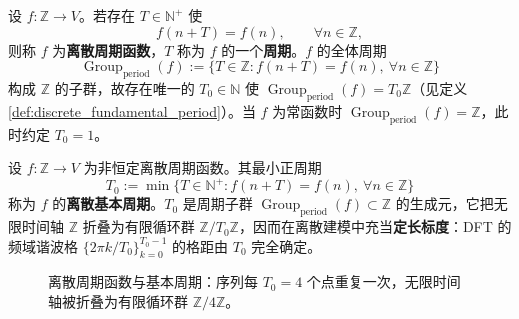 \begin{definition}[离散周期函数]\label{def:discrete_periodic_function}
设 $f:\mathbb{Z}\to V$。若存在 $T\in\mathbb{N}^+$ 使
\[
f(n+T)=f(n),\qquad \forall n\in\mathbb{Z},
\]
则称 $f$ 为\textbf{离散周期函数}，$T$ 称为 $f$ 的一个\textbf{周期}。$f$ 的全体周期
\[
\operatorname{Group}_{\mathrm{period}}(f):=\{T\in\mathbb{Z}:f(n+T)=f(n),\ \forall n\in\mathbb{Z}\}
\]
构成 $\mathbb{Z}$ 的子群，故存在唯一的 $T_0\in\mathbb{N}$ 使 $\operatorname{Group}_{\mathrm{period}}(f)=T_0\mathbb{Z}$（见定义 \ref{def:discrete_fundamental_period}）。当 $f$ 为常函数时 $\operatorname{Group}_{\mathrm{period}}(f)=\mathbb{Z}$，此时约定 $T_0=1$。
\end{definition}

\begin{definition}[离散基本周期与定长标度]\label{def:discrete_fundamental_period}
设 $f:\mathbb{Z}\to V$ 为非恒定离散周期函数。其最小正周期
\[
T_0:=\min\{T\in\mathbb{N}^+:f(n+T)=f(n),\ \forall n\in\mathbb{Z}\}
\]
称为 $f$ 的\textbf{离散基本周期}。$T_0$ 是周期子群 $\operatorname{Group}_{\mathrm{period}}(f)\subset\mathbb{Z}$ 的生成元，它把无限时间轴 $\mathbb{Z}$ 折叠为有限循环群 $\mathbb{Z}/T_0\mathbb{Z}$，因而在离散建模中充当\textbf{定长标度}：DFT 的频域谐波格 $\{2\pi k/T_0\}_{k=0}^{T_0-1}$ 的格距由 $T_0$ 完全确定。
\end{definition}

\begin{figure}[htbp]
\centering
{}
\caption{离散周期函数与基本周期：序列每 $T_0=4$ 个点重复一次，无限时间轴被折叠为有限循环群 $\mathbb{Z}/4\mathbb{Z}$。}
\label{fig:discrete_periodic}
\end{figure}


